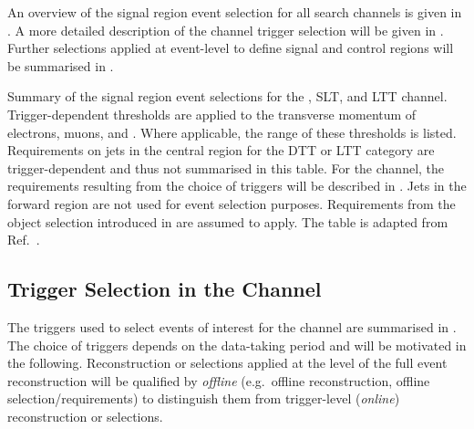 An overview of the signal region event selection for all search
channels is given in . A more detailed
description of the \hadhad channel trigger selection will be given in
. Further selections applied at
event-level to define signal and control regions will be summarised in
.

\begin{table}[htbp]
  \centering

  \caption{Summary of the signal region event selections for the \hadhad,
    \lephad SLT, and \lephad LTT channel. Trigger-dependent thresholds are
    applied to the transverse momentum of electrons, muons, and
    \tauhadvis. Where applicable, the range of these thresholds is listed.
    Requirements on jets in the central region for the DTT or LTT category are
    trigger-dependent and thus not summarised in this table. For the \hadhad
    channel, the requirements resulting from the choice of triggers will be
    described in . Jets in the forward region
    are not used for event selection purposes. Requirements from the object
    selection introduced in  are assumed to
    apply. The table is adapted from Ref.~\cite{HDBS-2018-40}.}%
  \label{tab:event_selection}

  \resizebox{\textwidth}{!}{
    
  }
\end{table}


\subsection{Trigger Selection in the \hadhad Channel}%
\label{sec:trigger}%
\label{sec:hadhad_trigger_selection}

The triggers used to select events of interest for the \hadhad channel
are summarised in . The choice of triggers
depends on the data-taking period and will be motivated in the
following. Reconstruction or selections applied at the level of the
full event reconstruction will be qualified by \emph{offline} (e.g.\
offline reconstruction, offline selection/requirements) to distinguish
them from trigger-level (\emph{online}) reconstruction or selections.

